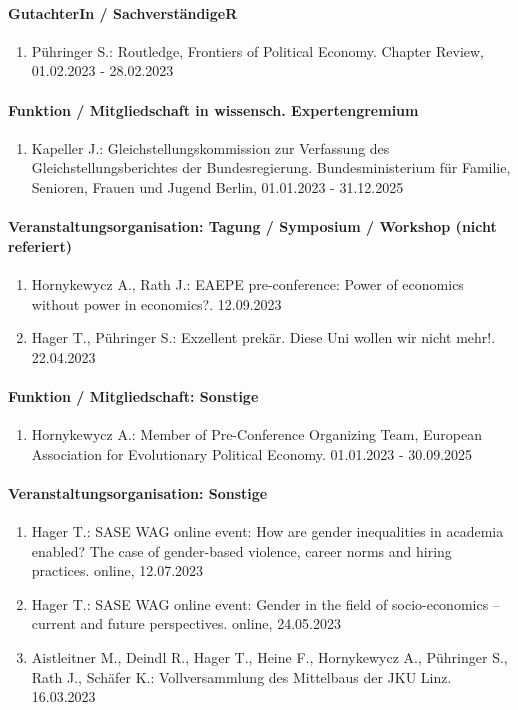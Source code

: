 \paragraph{GutachterIn / SachverständigeR} 
\begin{enumerate}[leftmargin=*, labelsep=0.5cm] 
 	 \item Pühringer S.: Routledge, Frontiers of Political Economy. Chapter Review, 01.02.2023 - 28.02.2023 
\end{enumerate} 
\paragraph{Funktion / Mitgliedschaft in wissensch. Expertengremium} 
\begin{enumerate}[leftmargin=*, labelsep=0.5cm] 
 	 \item Kapeller J.: Gleichstellungskommission zur Verfassung des Gleichstellungsberichtes der Bundesregierung. Bundesministerium für Familie, Senioren, Frauen und Jugend Berlin, 01.01.2023 - 31.12.2025 
\end{enumerate} 
\paragraph{Veranstaltungsorganisation: Tagung / Symposium / Workshop (nicht referiert)} 
\begin{enumerate}[leftmargin=*, labelsep=0.5cm] 
 	 \item Hornykewycz A., Rath J.: EAEPE pre-conference: Power of economics without power in economics?. 12.09.2023 
	 \item Hager T., Pühringer S.: Exzellent prekär. Diese Uni wollen wir nicht mehr!. 22.04.2023 
\end{enumerate} 
\paragraph{Funktion / Mitgliedschaft: Sonstige} 
\begin{enumerate}[leftmargin=*, labelsep=0.5cm] 
 	 \item Hornykewycz A.: Member of Pre-Conference Organizing Team, European Association for Evolutionary Political Economy. 01.01.2023 - 30.09.2025 
\end{enumerate} 
\paragraph{Veranstaltungsorganisation: Sonstige} 
\begin{enumerate}[leftmargin=*, labelsep=0.5cm] 
 	 \item Hager T.: SASE WAG online event: How are gender inequalities in academia enabled? The case of gender-based violence, career norms and hiring practices. online, 12.07.2023 
	 \item Hager T.: SASE WAG online event: Gender in the field of socio-economics – current and future perspectives. online, 24.05.2023 
	 \item Aistleitner M., Deindl R., Hager T., Heine F., Hornykewycz A., Pühringer S., Rath J., Schäfer K.: Vollversammlung des Mittelbaus der JKU Linz. 16.03.2023 
\end{enumerate} 
